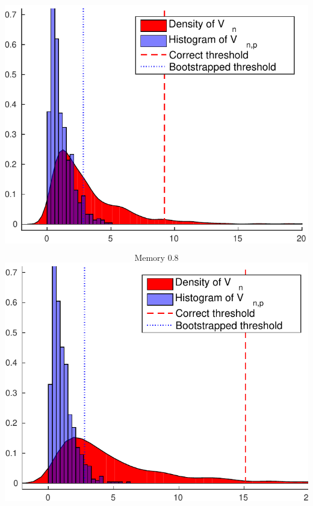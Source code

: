 \documentclass[landscape,a0]{a0poster_csml_v2}
\begin{document}
\begin{poster}
\begin{PosterColumn}
\begin{minipage}[c]{0.24\textwidth}
\includegraphics[width=\textwidth]{../img/permfail_ecdf7.pdf} 
\end{minipage}
\begin{minipage}[c]{0.24\textwidth}
$$\text{Memory }0.8$$
\includegraphics[width=\textwidth]{../img/permfail_ecdf8.pdf} 
\end{minipage}

\vspace{1cm}



\end{PosterColumn}
\end{poster}
\end{document}
